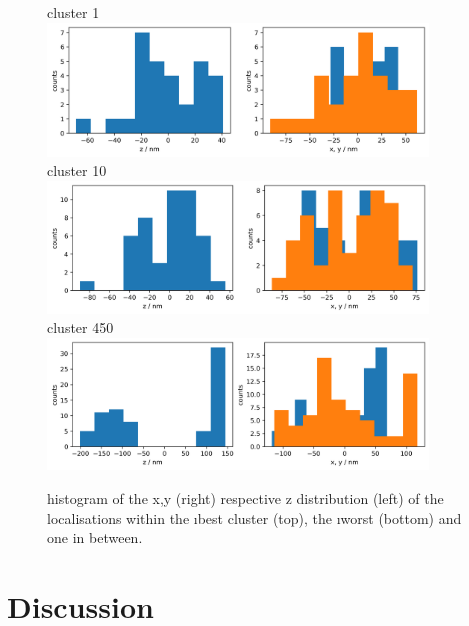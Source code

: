 \documentclass[11pt, a4paper, oneside, twocolumn]{report}
\begin{document}
\begin{figure}[h!]
  \centering
  cluster 1\\
  \includegraphics[width=0.9\textwidth]{10_histograms_1.png}\\
  cluster 10\\
  \includegraphics[width=0.9\textwidth]{10_histograms_10.png}\\
  cluster 450\\
  \includegraphics[width=0.9\textwidth]{10_histograms_450.png}
  \caption{histogram of the x,y (right) respective z distribution
    (left) of the localisations within the \i{best} cluster (top), the
    \i{worst} (bottom) and one in between.}
  \label{f:10_xyz_best_filtered_clusters}
\end{figure}


\twocolumn


\clearpage\chapter{Discussion}
\end{document}
